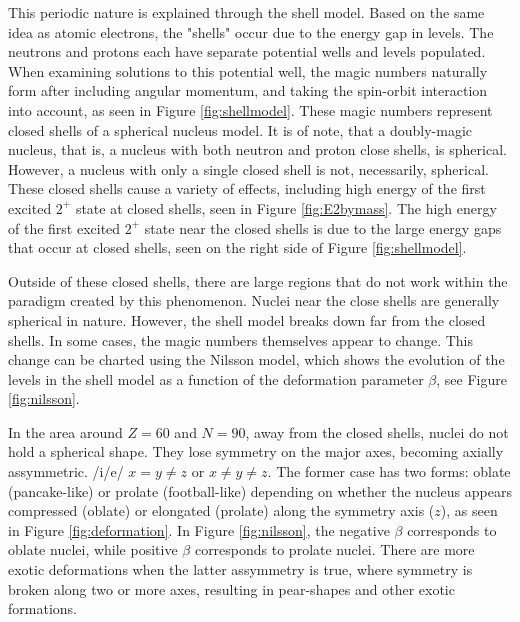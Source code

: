 This periodic nature is explained through the shell model. Based on the same idea as atomic electrons, the "shells" occur due to the energy gap in levels. The neutrons and protons each have separate potential wells and levels populated. When examining solutions to this potential well, the magic numbers naturally form after including angular momentum, and taking the spin-orbit interaction into account, as seen in Figure \ref{fig:shellmodel}. These magic numbers represent closed shells of a spherical nucleus model. It is of note, that a doubly-magic nucleus, that is, a nucleus with both neutron and proton close shells, is spherical. However, a nucleus with only a single closed shell is not, necessarily, spherical. These closed shells cause a variety of effects, including high energy of the first excited $2^+$ state at closed shells, seen in Figure \ref{fig:E2bymass}. The high energy of the first excited $2^+$ state near the closed shells is due to the large energy gaps that occur at closed shells, seen on the right side of Figure \ref{fig:shellmodel}.





% 

Outside of these closed shells, there are large regions that do not work within the paradigm created by this phenomenon. Nuclei near the close shells are generally spherical in nature. However, the shell model breaks down far from the closed shells. In some cases, the magic numbers themselves appear to change. This change can be charted using the Nilsson model, which shows the evolution of the levels in the shell model as a function of the deformation parameter $\beta$, see Figure \ref{fig:nilsson}.



In the area around $Z=60$ and $N=90$, away from the closed shells, nuclei do not hold a spherical shape. They lose symmetry on the major axes, becoming axially assymmetric. /i/e/ $x=y\neq z$ or $x \neq y \neq z$. The former case has two forms: oblate (pancake-like) or prolate (football-like) depending on whether the nucleus appears compressed (oblate) or elongated (prolate) along the symmetry axis ($z$), as seen in Figure \ref{fig:deformation}. In Figure \ref{fig:nilsson}, the negative $\beta$ corresponds to oblate nuclei, while positive $\beta$ corresponds to prolate nuclei. There are more exotic deformations when the latter assymmetry is true, where symmetry is broken along two or more axes, resulting in pear-shapes and other exotic formations.

